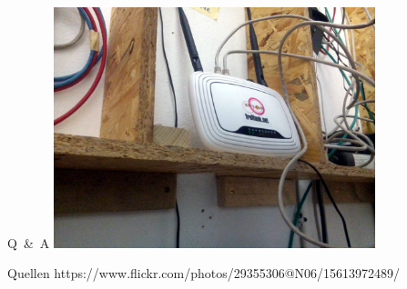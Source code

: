 \documentclass[handout, 10pt]{beamer}
\begin{document}
\begin{frame}{Q~\&~A}
\vfill
\centering
\includegraphics[width=0.7\textwidth]{images/irl_router}
\vfill
\end{frame}

\begin{frame}{Quellen}
https://www.flickr.com/photos/29355306@N06/15613972489/ \\
\end{frame}
\end{document}
